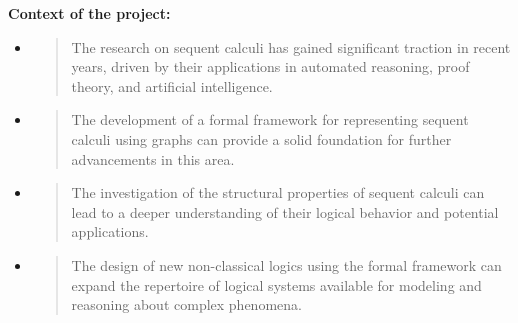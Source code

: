 \textbf{Context of the project:}

\begin{itemize}
\item
  \begin{quote}
  The research on sequent calculi has gained significant traction in
  recent years, driven by their applications in automated reasoning,
  proof theory, and artificial intelligence.
  \end{quote}
\item
  \begin{quote}
  The development of a formal framework for representing sequent calculi
  using graphs can provide a solid foundation for further advancements
  in this area.
  \end{quote}
\item
  \begin{quote}
  The investigation of the structural properties of sequent calculi can
  lead to a deeper understanding of their logical behavior and potential
  applications.
  \end{quote}
\item
  \begin{quote}
  The design of new non-classical logics using the formal framework can
  expand the repertoire of logical systems available for modeling and
  reasoning about complex phenomena.
  \end{quote}
\end{itemize}

